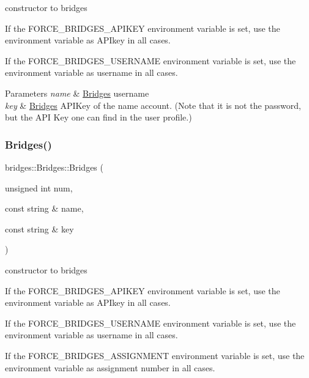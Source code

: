 constructor to bridges 

If the F\+O\+R\+C\+E\+\_\+\+B\+R\+I\+D\+G\+E\+S\+\_\+\+A\+P\+I\+K\+EY environment variable is set, use the environment variable as A\+P\+Ikey in all cases.

If the F\+O\+R\+C\+E\+\_\+\+B\+R\+I\+D\+G\+E\+S\+\_\+\+U\+S\+E\+R\+N\+A\+ME environment variable is set, use the environment variable as username in all cases.


\begin{DoxyParams}{Parameters}
{\em name} & \mbox{\hyperlink{classbridges_1_1_bridges}{Bridges}} username \\
\hline
{\em key} & \mbox{\hyperlink{classbridges_1_1_bridges}{Bridges}} A\+P\+I\+Key of the name account. (Note that it is not the password, but the A\+PI Key one can find in the user profile.) \\
\hline
\end{DoxyParams}
\mbox{\label{classbridges_1_1_bridges_aa58a928530695a5d0e9bf15fa09c8d84}} 
\subsubsection{\texorpdfstring{Bridges()}{Bridges()}\hspace{0.1cm}{\footnotesize\ttfamily [3/3]}}
{\footnotesize\ttfamily bridges\+::\+Bridges\+::\+Bridges (\begin{DoxyParamCaption}\item[{unsigned int}]{num,  }\item[{const string \&}]{name,  }\item[{const string \&}]{key }\end{DoxyParamCaption})\hspace{0.3cm}{\ttfamily [inline]}}



constructor to bridges 

If the F\+O\+R\+C\+E\+\_\+\+B\+R\+I\+D\+G\+E\+S\+\_\+\+A\+P\+I\+K\+EY environment variable is set, use the environment variable as A\+P\+Ikey in all cases.

If the F\+O\+R\+C\+E\+\_\+\+B\+R\+I\+D\+G\+E\+S\+\_\+\+U\+S\+E\+R\+N\+A\+ME environment variable is set, use the environment variable as username in all cases.

If the F\+O\+R\+C\+E\+\_\+\+B\+R\+I\+D\+G\+E\+S\+\_\+\+A\+S\+S\+I\+G\+N\+M\+E\+NT environment variable is set, use the environment variable as assignment number in all cases.



